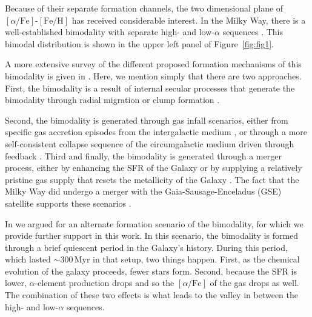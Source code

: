 \documentclass[linenumbers, twocolumn]{aastex631}
\newcommand{\Myr}{\ensuremath{\textrm{Myr}}}
\newcommand{\FeH}{\ensuremath{[\textrm{Fe}/\textrm{H}]}}
\newcommand{\alphaFe}{\ensuremath{[\alpha/\textrm{Fe}]}}
\begin{document}
Because of their separate formation channels, the two dimensional plane of \alphaFe{}-\FeH{} has received considerable interest. In the Milky Way, there is a well-established bimodality with separate high- and low-$\alpha$ sequences \citep{1996ASPC...92..307G,1998A&A...338..161F,2004AN....325....3F,2006MNRAS.367.1329R,2011A&A...535L..11A,2012A&A...545A..32A,2014A&A...562A..71B,2014ApJ...796...38N,2020MNRAS.493.2952H}. This bimodal distribution is shown in the upper left panel of Figure~\ref{fig:fig1}.

A more extensive survey of the different proposed formation mechanisms of this bimodality is given in \citet{2024arXiv240707985B}. Here, we mention simply that there are two approaches. First, the bimodality is a result of internal secular processes that generate the bimodality through radial migration \citep{2009MNRAS.396..203S,2021MNRAS.507.5882S,2023MNRAS.523.3791C} or clump formation \citep{2019MNRAS.484.3476C,2020MNRAS.492.4716B,2021MNRAS.502..260B,2023ApJ...953..128G}.

Second, the bimodality is generated through gas infall scenarios, either from specific gas accretion episodes from the intergalactic medium \citep{1997ApJ...477..765C,2009IAUS..254..191C,2017MNRAS.472.3637G,2019A&A...623A..60S}, or through a more self-consistent collapse sequence of the circumgalactic medium driven through feedback \citep{2021MNRAS.501.5176K}. Third and finally, the bimodality is generated through a merger process, either by enhancing the SFR of the Galaxy \citep{2004ApJ...612..894B,2005ApJ...630..298B,2007ApJ...658...60B,2010MNRAS.402.1489R} or by supplying a relatively pristine gas supply that resets the metallicity of the Galaxy \citep{2020MNRAS.491.5435B,2024MNRAS.528L.122C}. The fact that the Milky Way did undergo a merger with the Gaia-Sausage-Enceladus (GSE) satellite supports these scenarios \citep{2018MNRAS.478..611B,2018Natur.563...85H,2020ApJ...901...48N}.

In \citet{2024arXiv240707985B} we argued for an alternate formation scenario of the bimodality, for which we provide further support in this work. In this scenario, the bimodality is formed through a brief quiescent period in the Galaxy's history. During this period, which lasted $\sim300\,\Myr$ in that setup, two things happen. First, as the chemical evolution of the galaxy proceeds, fewer stars form. Second, because the SFR is lower, $\alpha$-element production drops and so the \alphaFe{} of the gas drops as well. The combination of these two effects is what leads to the valley in between the high- and low-$\alpha$ sequences.
\end{document}
